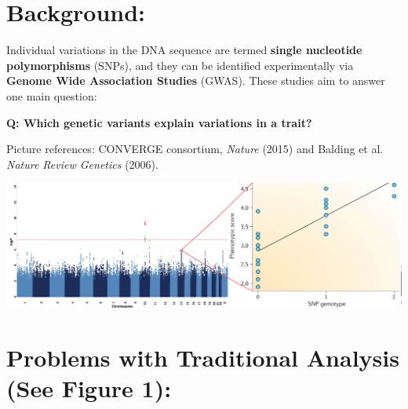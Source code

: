 \documentclass[a0,portrait]{a0poster}
\begin{document}
\begin{multicols}{2} %

\color{Navy} %
\section*{Background:}

\color{Black} %

\large

\raggedright
Individual variations in the DNA sequence are termed \textbf{single nucleotide polymorphisms} (SNPs), and they can be identified experimentally via \textbf{Genome Wide Association Studies} (GWAS). These studies aim to answer one main question:

\vspace{1cm}
\centering \Large \textbf{Q: Which genetic variants explain variations in a trait?}

\vspace{1cm}

\raggedright \large

\begin{center}
\color{Black} \footnotesize Picture references: CONVERGE consortium, \textit{Nature} (2015) and Balding et al. \textit{Nature Review Genetics} (2006).
\end{center}

\begin{center}
\includegraphics[width=1.0\linewidth]{intro_ver2.png}
\end{center}

\color{Navy} %
\section*{Problems with Traditional Analysis (See Figure 1):}
\color{black}


\end{multicols}
\end{document}
